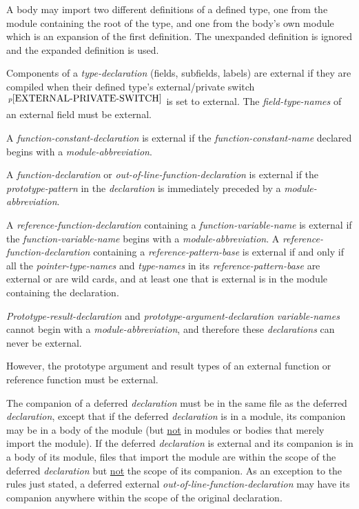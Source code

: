 \documentclass[12pt]{article}
\newcommand{\pagnote}[1]{$\,^{p\pageref{#1}}$}
\begin{document}
A body may import two different definitions of a defined type,
one from the module containing the root of the type, and one
from the body's own module which is an expansion of the
first definition.  The unexpanded definition is ignored and the
expanded definition is used.

Components of a {\em type-declaration} (fields, subfields, labels)
are external if they are compiled when their defined type's
external/private switch\pagnote{EXTERNAL-PRIVATE-SWITCH} is set to external.
The {\em field-type-names} of an external field must be external.

A {\em function-constant-declaration}
is external if the {\em function-constant-name}
declared begins with a
{\em module-abbrev\-i\-a\-tion}.

A {\em function-declaration}
or {\em out-of-line-function-declar\-a\-tion}
is external\label{EXTERNAL-FUNCTION}
if the {\em prototype-pattern} in the {\em declaration}
is immediately preceded by a {\em module-abbreviation}.

A {\em reference-function-declaration} containing a
{\em function-variable-name}
is external if the {\em func\-tion-variable-name} begins with a
{\em module-abbreviation}.
A {\em reference-function-declaration} containing a
{\em reference-pattern-base} is external if and only if
all the {\em pointer-type-names}
and {\em type-names} in its {\em reference-pattern-base} are external or
are wild cards, and at least one that is external is in the
module containing the declaration.

{\em Prototype-result-declaration} and {\em prototype-argument-declaration}
{\em variable-names} cannot begin with a {\em module-abbreviation},
and therefore these {\em declarations} can never be external.

However, the prototype argument and result types of an external function
or reference function
must be external.

The companion of a deferred {\em declaration} must be in the same file as the
deferred {\em declaration},
except that if the deferred {\em declaration} is in a module,
its companion may be
in a body of the module (but \underline{not} in modules or bodies that
merely import the module).  If the deferred {\em declaration} is external
and its companion is in a body of its module, files that import the
module are within the scope of the deferred {\em declaration}
but \underline{not} the scope of its companion.
As an exception to the rules just stated,
a deferred external {\em out-of-line-function-declaration}
may have its companion
anywhere within the scope of the original declaration.
\end{document}
